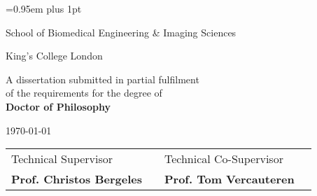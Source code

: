 \begin{titlepage}

\pagestyle{empty}


\vspace*{1.5cm}

\begin{center}
	{\LARGE{\theauthor}\par}
\end{center}
\vspace{0.6cm}
\begin{center}
        {\huge\baselineskip=0.95em plus 1pt \expandafter{
        \textbf{\thetitle}
        \par}}
\end{center}


\vspace{3cm}

\begin{center}
	\expandafter{\LARGE{School of Biomedical Engineering \& Imaging Sciences}\par}
	\expandafter{\Large{\textrm{King's College London}}}\par
\end{center}

\vspace{1.5cm}

\begin{center}
	A dissertation submitted in partial fulfilment 
	\\
	of the requirements for the degree of
	\\ 
	\textbf{Doctor of Philosophy}	
\end{center}

\vspace{0.2cm}
\begin{center}
	\today
\end{center}

\vspace{1.0cm}

\begin{center}
\begin{tabular}{l p{3.3cm} l l}
	
Technical Supervisor & & Technical Co-Supervisor \\
\textbf{Prof. Christos Bergeles} & & \textbf{Prof. Tom Vercauteren}
	
\end{tabular}
\end{center}

\end{titlepage} 